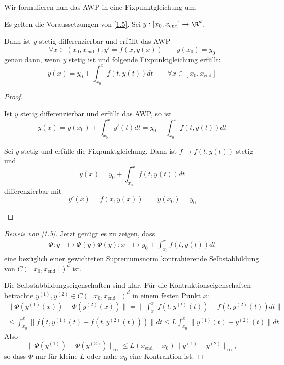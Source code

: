 \documentclass[
]{mycourse}
\begin{document}
Wir formulieren nun das AWP in eine Fixpunktgleichung um.

\begin{lem} \label{1.9}
	Es gelten die Voraussetzungen von \ref{1.5}.
	Sei $y:[x_0,x_{\text{end}}] \to \R^d$.

	Dann ist $y$ stetig differenzierbar und erfüllt das AWP
	\[
		\forall x \in (x_0,x_{\text{end}}): y'=f(x,y(x))  \qquad y(x_0) = y_0
	\]
	genau dann, wenn $y$ stetig ist und folgende Fixpunktgleichung erfüllt:
	\[
		y(x) = y_0 + \int_{x_0}^{x} f(t, y(t)) dt
		\qquad \forall x \in [x_0,x_{\text{end}}]
	\]
	\begin{proof}
		\begin{seg}[$\implies$]
			Ist $y$ stetig differenzierbar und erfüllt das AWP, so ist
			\[
				y(x) = y(x_0) + \int_{x_0}^x y'(t) dt = y_0 + \int_{x_0}^x f(t,y(t)) dt
			\]
		\end{seg}
		\begin{seg}[$\Longleftarrow$]
			Sei $y$ stetig und erfülle die Fixpunktgleichung.
			Dann ist $f \mapsto f(t, y(t))$ stetig und
			\[
				y(x) = y_0 + \int_{x_0}^x f(t,y(t)) dt
			\]
			differenzierbar mit
			\[
				y'(x) = f(x,y(x))
				\qquad y(x_0) = y_0
			\]
		\end{seg}
	\end{proof}
\end{lem}

\begin{proof}[Beweis von \ref{1.5}]
	Jetzt genügt es zu zeigen, dass
	\begin{align*}
		\Phi: y &\mapsto \Phi(y)
		\Phi(y): x &\mapsto y_0 + \int_{x_0}^x f(t,y(t)) dt
	\end{align*}
	eine bezüglich einer gewichteten Supremumsnorm kontrahierende Selbstabbildung von $C([x_0,x_{\text{end}}])^d$ ist.

	Die Selbstabbildungseigenschaften sind klar.
	Für die Kontraktionseigenschaften betrachte $y^{(1)}, y^{(2)} \in C([x_0,x_\text{end}])^d$ in einem festen Punkt $x$:
	\begin{align*}
		\|\Phi(y^{(1)}(x)) - \Phi(y^{(2)}(x))\|
		= \bigg\| \int_{x_0}^x f(t,y^{(t)}(t)) - f(t,y^{(2)}(t)) dt \bigg\| \\
		\le \int_{x_0}^x \| f(t, y^{(1)}(t) - f(t, y^{(2)}(t))) \| dt
		\le L \int_{x_0}^x \| y^{(1)}(t) - y^{(2)}(t) \| dt
	\end{align*}
	Also
	\[
		\|\Phi(y^{(1)}) - \Phi(y^{(2)}) \|_\infty \le L(x_{\text{end}}-x_0) \|y^{(1)}  - y^{(2)}\|_\infty,
	\]
	so dass $\Phi$ nur für kleine $L$ oder nahe $x_0$ eine Kontraktion ist.

\end{proof}
\end{document}
